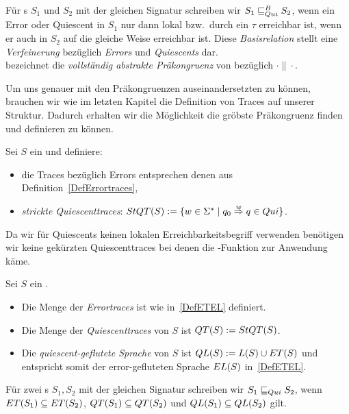 \begin{Def}
  Für \EIO{}s $S_1$ und $S_2$ mit der gleichen Signatur schreiben wir
  $S_1\sqsubseteq _{Qui}^B S_2$, wenn ein Error oder Quiescent in $S_1$ nur dann lokal bzw.\
  durch ein $\tau$ erreichbar ist, wenn er auch in $S_2$ auf die gleiche Weise
  erreichbar ist. Diese \emph{Basisrelation} stellt eine \emph{Verfeinerung}
  bezüglich \emph{Errors} und \emph{Quiescents} dar.\\
  \QCRel{} bezeichnet die \emph{vollständig abstrakte Präkongruenz} von
  \QBRel{} bezüglich $\cdot\|\cdot$.
\end{Def}

Um uns genauer mit den Präkongruenzen auseinandersetzten zu können, brauchen
wir wie im letzten Kapitel die Definition von Traces auf unserer Struktur.
Dadurch erhalten wir die Möglichkeit die gröbste Präkongruenz finden und
definieren zu können.

\begin{Def}
  \label{DefQuiescenttraces}
  Sei $S$ ein \EIO{} und definiere:
  \begin{itemize}
    \item die Traces bezüglich Errors entsprechen denen
      aus Definition~\ref{DefErrortraces},
    \item \emph{strickte Quiescenttraces}: $StQT{}(S) := \{w\in\Sigma ^*\mid q_0
      \overset{w}{\Rightarrow} q\in Qui\}$.
  \end{itemize}
\end{Def}

Da wir für Quiescents keinen lokalen Erreichbarkeitsbegriff verwenden benötigen
wir keine gekürzten Quiescenttraces bei denen die \prune{}-Funktion zur
Anwendung käme.

\begin{Def}
  \label{DefQTQL}
  Sei $S$ ein \EIO{}.
  \begin{itemize}
    \item Die Menge der \emph{Errortraces} ist wie in~\ref{DefETEL} definiert.
    \item Die Menge der \emph{Quiescenttraces} von $S$ ist $QT{}(S) := StQT{}(S)$.
    \item Die \emph{quiescent-geflutete Sprache} von $S$ ist
      $QL{}(S):=L(S)\cup ET{}(S)$ und entspricht somit der error-gefluteten
      Sprache $EL{}(S)$ in~\ref{DefETEL}.
  \end{itemize}
  Für zwei \EIO{}s $S_1, S_2$ mit der gleichen Signatur schreiben wir
  $S_1\sqsubseteq _{Qui} S_2$, wenn $ET{}(S_1)\subseteq ET{}(S_2)$,
  $QT{}(S_1)\subseteq QT{}(S_2)$ und $QL{}(S_1)\subseteq QL{}(S_2)$ gilt.
\end{Def}

